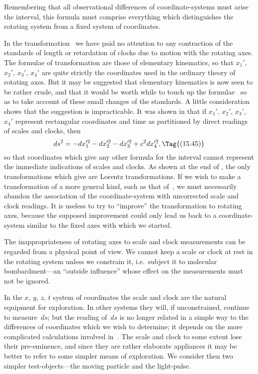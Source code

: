 \documentclass[12pt]{book}
\begin{document}
Remembering that all observational differences of coordinate\hyp{}systems must
arise  the interval, this formula must comprise everything which distinguishes
the rotating system from a fixed system of coordinates.

In the transformation~ we have paid no attention to any contraction
of the standards of length or retardation of clocks due to motion with the
rotating axes. The formulae of transformation are those of elementary
kinematics, so that $x_1'$, $x_2'$, $x_3'$, $x_4'$ are quite strictly the coordinates used in
the ordinary theory of rotating axes. But it may be suggested that elementary
kinematics is now seen to be rather crude, and that it would be worth while
to touch up the formulae~ so as to take account of these small changes
of the standards. A little consideration shows that the suggestion is impracticable.
It was shown in  that if $x_1'$, $x_2'$, $x_3'$, $x_4'$ represent rectangular
coordinates and time as partitioned by direct readings of scales and clocks, then
\[
ds^2 = -dx_1'^2 - dx_2'^2 - dx_3'^2 + c^2 dx_4'^2,
\Tag{(15.45)}
\]
so that coordinates which give any other formula for the interval cannot
represent the immediate indications of scales and clocks. As shown at the
end of , the only transformations which give  are Lorentz transformations.
If we wish to make a transformation of a more general kind, such
as that of~, we must necessarily abandon the association of the coordinate\hyp{}system
with uncorrected scale and clock readings. It is useless to try to
``improve'' the transformation to rotating axes, because the supposed improvement
could only lead us back to a coordinate\hyp{}system similar to the fixed
axes with which we started.

The inappropriateness of rotating axes to scale and clock measurements
can be regarded from a physical point of view. We cannot keep a scale or
clock at rest in the rotating system unless we constrain it, i.e.\ subject it to
molecular bombardment---an ``outside influence'' whose effect on the measurements
must not be ignored.

In the $x$, $y$, $z$, $t$ system of coordinates the scale and clock are the natural
equipment for exploration. In other systems they will, if unconstrained, continue
to measure~$ds$; but the reading of~$ds$ is no longer related in a simple
way to the differences of coordinates which we wish to determine; it depends
on the more complicated calculations involved in~. The scale and clock
to some extent lose their pre\hyp{}eminence, and since they are rather elaborate
appliances it may be better to refer to some simpler means of exploration.
We consider then two simpler test\hyp{}objects---the moving particle and the
%
%
light-pulse.
\end{document}
